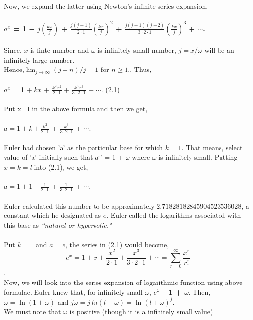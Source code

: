 \documentclass[a4paper,11pt]{article}
\begin{document}
\noindent Now, we expand the latter using Newton's infinite series expansion.\\
\\
\textbf{$a^x$ = 1 + $j(\frac{kx}{j})$ + $\frac{j(j-1)}{2\cdot1}(\frac{kx}{j})^2$ + $\frac{j(j-1)(j-2)}{3\cdot2\cdot1}(\frac{kx}{j})^3$ + $\cdots$.}\\
\\
Since, $x$ is finte number and $\omega$ is infinitely small number, $j=x/\omega$ will be an infinitely large number.\\
Hence,$ \lim_{j\to\infty}(j-n)/j = 1$ for $n\geq1.$. Thus,\\
\\
\indent $a^x$ = 1 + $kx$ + $\frac{k^2x^2}{2\cdot1}$ +  $\frac{k^3x^3}{3\cdot2\cdot1}$  + $\cdots$. \hspace{2cm} (2.1)\\
\\
Put x=1 in the above formula and then we get,\\
\\
\indent $a = 1 + k + \frac{k^2}{2\cdot1}$ + $\frac{k^3}{3\cdot2\cdot1}$ + $\cdots$.\\
\\
Euler had chosen 'a' as the particular base 
for which $k = 1$. That means, select value of 'a' initially such that $a^\omega$ = 1 + $\omega$
where $\omega$ is infinitely small. Putting $x = k = l$ into (2.1), we get,
\\
\\
\indent $a = 1 + 1 + \frac{1}{2\cdot1}$ + $\frac{1}{3\cdot2\cdot1}$ + $\cdots$.\\
\\
\noindent Euler calculated this number to be approximately 
$2. 71828182845904523536028$, 
a constant which he designated as $e$. Euler called the logarithms associated with this base as \textit{``natural or hyperbolic."}\\ 
\\
Put $k = 1$ and $a = e$, the series in (2.1) would become,\\
$$ e^x = 1 + x + \frac{x^2}{2\cdot1} + \frac{x^3}{3\cdot2\cdot1} + \cdots = 
\sum_{r=0}^{\infty}\frac{x^r}{r!} $$.\\
Now, we will look into the series expansion of logarithmic function using above formulae. Euler knew that, for infinitely small $\omega$,
\textbf{$ e^\omega $ =1 + $\omega$}.
Then, $\omega =\ln(1+\omega)$ and $j\omega = j\ ln(l + \omega) = \ln(l + \omega )^j$. \\
We must note that $\omega$ is positive (though it is a infinitely small value)
\end{document}
